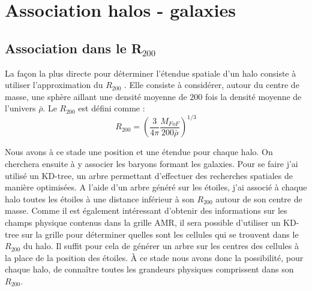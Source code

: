 \section{Association halos - galaxies}

\subsection{Association dans le R$_{200}$}

La façon la plus directe pour déterminer l'étendue spatiale d'un halo consiste à utiliser l'approximation du $R_{200}$ \citep{1997ApJ...490..493N}.
Elle consiste à considérer, autour du centre de masse, une sphère aillant une densité moyenne de $200$ fois la densité moyenne de l'univers $\bar{\rho}$.
Le $R_{200}$ est défini comme : 
\begin{equation}
R_{200}= \left( \frac{3}{4\pi} \frac{M_{FoF} }{200 \bar{\rho}}  \right)^{1/3}
\end{equation}




%

Nous avons à ce stade une position et une étendue pour chaque halo.
On cherchera ensuite à y associer les baryons formant les galaxies.
Pour se faire j'ai utilisé un KD-tree, un arbre permettant d'effectuer des recherches spatiales de manière optimisées.
A l'aide d'un arbre généré sur les étoiles, j'ai associé à chaque halo toutes les étoiles à une distance inférieur à son $R_{200}$ autour de son centre de masse.
Comme il est également intéressant d'obtenir des informations sur les champs physique contenus dans la grille \ac{AMR}, il sera possible d'utiliser un KD-tree sur la grille pour déterminer quelles sont les cellules qui se trouvent dans le $R_{200}$ du halo.
Il suffit pour cela de générer un arbre sur les centres des cellules à la place de la position des étoiles.
À ce stade nous avons donc la possibilité, pour chaque halo, de connaître toutes les grandeurs physiques comprissent dans son $R_{200}$.

